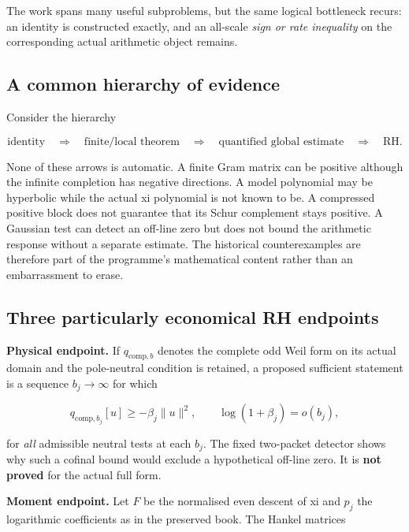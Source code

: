 \documentclass[
  10pt,
  a4paper,
  10pt,
  oneside,
  openany]{book}
\begin{document}
The work spans many useful subproblems, but the same logical bottleneck
recurs: an identity is constructed exactly, and an all-scale \emph{sign
or rate inequality} on the corresponding actual arithmetic object
remains.

\subsection{A common hierarchy of
evidence}\label{a-common-hierarchy-of-evidence}

Consider the hierarchy

\[
\text{identity}\quad\Longrightarrow\quad
\text{finite/local theorem}\quad\Longrightarrow\quad
\text{quantified global estimate}\quad\Longrightarrow\quad\text{RH}.
\tag{S1.2}\label{eq:S1.2}
\]

None of these arrows is automatic. A finite Gram matrix can be positive
although the infinite completion has negative directions. A model
polynomial may be hyperbolic while the actual xi polynomial is not known
to be. A compressed positive block does not guarantee that its Schur
complement stays positive. A Gaussian test can detect an off-line zero
but does not bound the arithmetic response without a separate estimate.
The historical counterexamples are therefore part of the programme's
mathematical content rather than an embarrassment to erase.

\subsection{Three particularly economical RH
endpoints}\label{three-particularly-economical-rh-endpoints}

\textbf{Physical endpoint.} If \(q_{\mathrm{comp},b}\) denotes the
complete odd Weil form on its actual domain and the pole-neutral
condition is retained, a proposed sufficient statement is a sequence
\(b_j\to\infty\) for which

\[
q_{\mathrm{comp},b_j}[u]\ge -\beta_j\|u\|^2,
\qquad \log(1+\beta_j)=o(b_j),
\tag{S1.3}\label{eq:S1.3}
\]

for \emph{all} admissible neutral tests at each \(b_j\). The fixed
two-packet detector shows why such a cofinal bound would exclude a
hypothetical off-line zero. It is \textbf{not proved} for the actual
full form.

\textbf{Moment endpoint.} Let \(F\) be the normalised even descent of xi
and \(p_j\) the logarithmic coefficients as in the preserved book. The
Hankel matrices
\end{document}
